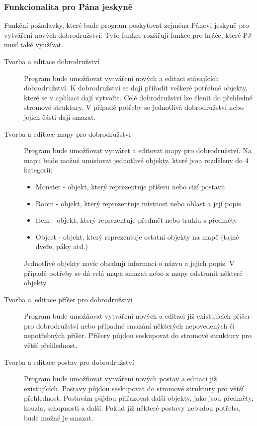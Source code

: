 \documentclass[thesis=B,czech]{resources/FITthesis}[2012/06/26]
\begin{document}
\subsubsection{Funkcionalita pro Pána jeskyně}
Funkční požadavky, které bude program poskytovat zejména Pánovi jeskyně pro vytváření nových dobrodružství. Tyto funkce rozšiřují funkce pro hráče, které PJ musí také využívat.
\begin{description}


\item[Tvorba a editace dobrodružství] Program bude umožňovat vytváření nových a editaci stávajících dobrodružství. K dobrodružství se dají přiřadit veškeré potřebné objekty, které se v aplikaci dají vytvořit. Celé dobrodružství lze členit do přehledné stromové struktury. V případě potřeby se jednotlivá dobrodružství nebo jejich části dají smazat.

\item[Tvorba a editace mapy pro dobrodružství] Program bude umožňovat vytvářet a editovat mapy pro dobrodružství. Na mapu bude možné umisťovat jednotlivé objekty, které jsou rozděleny do 4 kategorií:
\begin{itemize}
\item Monster - objekt, který reprezentuje příšeru nebo cizí postavu
\item Room - objekt, který reprezentuje místnost nebo oblast a její popis
\item Item - objekt, který reprezentuje předmět nebo truhlu s předměty
\item Object - objekt, který reprezentuje ostatní  objekty na mapě (tajné dveře, páky atd.)
\end{itemize}
Jednotlivé objekty navíc obsahují informaci o názvu a jejich popis. V případě potřeby se dá celá mapa smazat nebo z mapy odstranit některé objekty. 

\item[Tvorba a~editace příšer pro dobrodružství] Program bude umožňovat vytváření nových a editaci již existujících příšer pro dobrodružství nebo případné smazání některých nepovedených či nepotřebných příšer. Příšery půjdou seskupovat do stromové struktury pro větší přehlednost.

\item[Tvorba a editace postav pro dobrodružství] Program bude umožňovat vytváření nových postav a editaci již existujících. Postavy půjdou seskupovat do stromové struktury pro větší přehlednost. Postavám půjdou přiřazovat další objekty, jako jsou předměty, kouzla, schopnosti a další. Pokud již některé postavy nebudou potřeba, bude možné je smazat.


\end{description}
\end{document}
